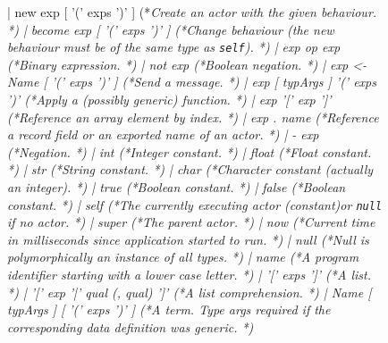 \documentclass[5p,times]{elsarticle}
\begin{document}
\begin{figure}
\begin{ESL}
        |  new exp [ '(' exps ')' ]                            (*\rmfamily\it Create an actor with the given behaviour. *)
        |  become exp [ '(' exps ')' ]                         (*\rmfamily\it Change behaviour (the new behaviour must be of the same type as {\tt self}). *)
        |  exp op exp                                          (*\rmfamily\it Binary expression. *)
        |  not exp                                             (*\rmfamily\it Boolean negation. *)
        |  exp <- Name [ '(' exps ')' ]                        (*\rmfamily\it Send a message. *)
        |  exp [ typArgs ] '(' exps ')'                        (*\rmfamily\it Apply a (possibly generic) function. *)
        |  exp '[' exp ']'                                     (*\rmfamily\it Reference an array element by index. *)
        |  exp . name                                          (*\rmfamily\it Reference a record field or an exported name of an actor. *)
        |  - exp                                               (*\rmfamily\it Negation. *)
        |  int                                                 (*\rmfamily\it Integer constant. *)
        |  float                                               (*\rmfamily\it Float constant. *)
        |  str                                                 (*\rmfamily\it String constant. *)
        |  char                                                (*\rmfamily\it Character constant (actually an integer). *)
        |  true                                                (*\rmfamily\it Boolean constant. *)
        |  false                                               (*\rmfamily\it Boolean constant. *)
        |  self                                                (*\rmfamily\it The currently executing actor (constant)or {\tt null} if no actor. *)
        |  super                                               (*\rmfamily\it The parent actor. *)
        |  now                                                 (*\rmfamily\it Current time in milliseconds since application started to run. *)
        |  null                                                (*\rmfamily\it Null is polymorphically an instance of all types. *)
        |  name                                                (*\rmfamily\it A program identifier starting with a lower case letter. *)
        |  '[' exps ']'                                        (*\rmfamily\it A list. *)
        |  '[' exp '|' qual (, qual) ']'                       (*\rmfamily\it A list comprehension. *)
        |  Name [ typArgs ] [ '(' exps ')' ]                   (*\rmfamily\it A term. Type args required if the corresponding data definition was generic. *)

\end{ESL}
\end{figure}
\end{document}
